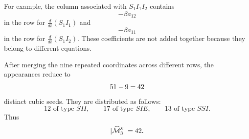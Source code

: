 

For example, the column associated with $S_1I_1I_2$ contains
\[
-\beta a_{12}
\]
in the row for $\frac{d}{dt}(S_1I_1)$ and
\[
-\beta a_{11}
\]
in the row for $\frac{d}{dt}(S_1I_2)$. These coefficients are not added
together because they belong to different equations.

After merging the nine repeated coordinates across different rows, the
\NumRawCubic{} appearances reduce to
\[
51-9=42
\]
distinct cubic seeds. They are distributed as follows:
\[
12\text{ of type }SII,
\qquad
17\text{ of type }SIE,
\qquad
13\text{ of type }SSI.
\]
Thus
\[
|\widehat{\mathcal M}_3^{\mathcal{E}}|=42.
\]

